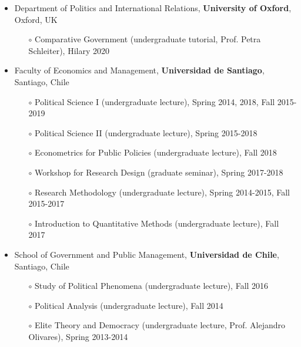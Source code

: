 \begin{cventries}

\begin{itemize}
\item{\small Department of Politics and International Relations, {\bfseries University of Oxford}, Oxford, UK}
\begin{itemize}
\item[$\circ$]{\small Comparative Government (undergraduate tutorial, Prof. Petra Schleiter), Hilary 2020}
\end{itemize}
\item{\small Faculty of Economics and Management, {\bfseries Universidad de Santiago}, Santiago, Chile}
\begin{itemize}
\item[$\circ$]{\small Political Science I (undergraduate lecture), Spring 2014, 2018, Fall 2015-2019}
\item[$\circ$]{\small Political Science II (undergraduate lecture), Spring 2015-2018}
\item[$\circ$]{\small Econometrics for Public Policies (undergraduate lecture), Fall 2018}
\item[$\circ$]{\small Workshop for Research Design (graduate seminar), Spring 2017-2018}
\item[$\circ$]{\small Research Methodology (undergraduate lecture), Spring 2014-2015, Fall 2015-2017}
\item[$\circ$]{\small Introduction to Quantitative Methods (undergraduate lecture), Fall 2017}
\end{itemize}
\item{\small School of Government and Public Management, {\bfseries Universidad de Chile}, Santiago, Chile}
\begin{itemize}
\item[$\circ$]{\small Study of Political Phenomena (undergraduate lecture), Fall 2016}
\item[$\circ$]{\small Political Analysis (undergraduate lecture), Fall 2014}
\item[$\circ$]{\small Elite Theory and Democracy (undergraduate lecture, Prof. Alejandro Olivares), Spring 2013-2014}
\end{itemize}
\end{itemize}

\vspace{1mm}
\end{cventries}
